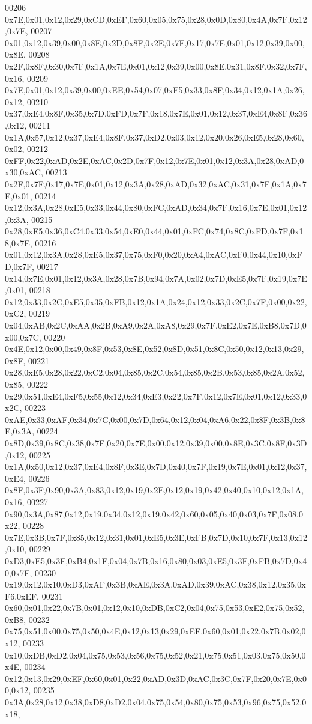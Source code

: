 \begin{DoxyCode}
00206 0x7E,0x01,0x12,0x29,0xCD,0xEF,0x60,0x05,0x75,0x28,0x0D,0x80,0x4A,0x7F,0x12,0x7E,
00207 0x01,0x12,0x39,0x00,0x8E,0x2D,0x8F,0x2E,0x7F,0x17,0x7E,0x01,0x12,0x39,0x00,0x8E,
00208 0x2F,0x8F,0x30,0x7F,0x1A,0x7E,0x01,0x12,0x39,0x00,0x8E,0x31,0x8F,0x32,0x7F,0x16,
00209 0x7E,0x01,0x12,0x39,0x00,0xEE,0x54,0x07,0xF5,0x33,0x8F,0x34,0x12,0x1A,0x26,0x12,
00210 0x37,0xE4,0x8F,0x35,0x7D,0xFD,0x7F,0x18,0x7E,0x01,0x12,0x37,0xE4,0x8F,0x36,0x12,
00211 0x1A,0x57,0x12,0x37,0xE4,0x8F,0x37,0xD2,0x03,0x12,0x20,0x26,0xE5,0x28,0x60,0x02,
00212 0xFF,0x22,0xAD,0x2E,0xAC,0x2D,0x7F,0x12,0x7E,0x01,0x12,0x3A,0x28,0xAD,0x30,0xAC,
00213 0x2F,0x7F,0x17,0x7E,0x01,0x12,0x3A,0x28,0xAD,0x32,0xAC,0x31,0x7F,0x1A,0x7E,0x01,
00214 0x12,0x3A,0x28,0xE5,0x33,0x44,0x80,0xFC,0xAD,0x34,0x7F,0x16,0x7E,0x01,0x12,0x3A,
00215 0x28,0xE5,0x36,0xC4,0x33,0x54,0xE0,0x44,0x01,0xFC,0x74,0x8C,0xFD,0x7F,0x18,0x7E,
00216 0x01,0x12,0x3A,0x28,0xE5,0x37,0x75,0xF0,0x20,0xA4,0xAC,0xF0,0x44,0x10,0xFD,0x7F,
00217 0x14,0x7E,0x01,0x12,0x3A,0x28,0x7B,0x94,0x7A,0x02,0x7D,0xE5,0x7F,0x19,0x7E,0x01,
00218 0x12,0x33,0x2C,0xE5,0x35,0xFB,0x12,0x1A,0x24,0x12,0x33,0x2C,0x7F,0x00,0x22,0xC2,
00219 0x04,0xAB,0x2C,0xAA,0x2B,0xA9,0x2A,0xA8,0x29,0x7F,0xE2,0x7E,0xB8,0x7D,0x00,0x7C,
00220 0x4E,0x12,0x00,0x49,0x8F,0x53,0x8E,0x52,0x8D,0x51,0x8C,0x50,0x12,0x13,0x29,0x8F,
00221 0x28,0xE5,0x28,0x22,0xC2,0x04,0x85,0x2C,0x54,0x85,0x2B,0x53,0x85,0x2A,0x52,0x85,
00222 0x29,0x51,0xE4,0xF5,0x55,0x12,0x34,0xE3,0x22,0x7F,0x12,0x7E,0x01,0x12,0x33,0x2C,
00223 0xAE,0x33,0xAF,0x34,0x7C,0x00,0x7D,0x64,0x12,0x04,0xA6,0x22,0x8F,0x3B,0x8E,0x3A,
00224 0x8D,0x39,0x8C,0x38,0x7F,0x20,0x7E,0x00,0x12,0x39,0x00,0x8E,0x3C,0x8F,0x3D,0x12,
00225 0x1A,0x50,0x12,0x37,0xE4,0x8F,0x3E,0x7D,0x40,0x7F,0x19,0x7E,0x01,0x12,0x37,0xE4,
00226 0x8F,0x3F,0x90,0x3A,0x83,0x12,0x19,0x2E,0x12,0x19,0x42,0x40,0x10,0x12,0x1A,0x16,
00227 0x90,0x3A,0x87,0x12,0x19,0x34,0x12,0x19,0x42,0x60,0x05,0x40,0x03,0x7F,0x08,0x22,
00228 0x7E,0x3B,0x7F,0x85,0x12,0x31,0x01,0xE5,0x3E,0xFB,0x7D,0x10,0x7F,0x13,0x12,0x10,
00229 0xD3,0xE5,0x3F,0xB4,0x1F,0x04,0x7B,0x16,0x80,0x03,0xE5,0x3F,0xFB,0x7D,0x40,0x7F,
00230 0x19,0x12,0x10,0xD3,0xAF,0x3B,0xAE,0x3A,0xAD,0x39,0xAC,0x38,0x12,0x35,0xF6,0xEF,
00231 0x60,0x01,0x22,0x7B,0x01,0x12,0x10,0xDB,0xC2,0x04,0x75,0x53,0xE2,0x75,0x52,0xB8,
00232 0x75,0x51,0x00,0x75,0x50,0x4E,0x12,0x13,0x29,0xEF,0x60,0x01,0x22,0x7B,0x02,0x12,
00233 0x10,0xDB,0xD2,0x04,0x75,0x53,0x56,0x75,0x52,0x21,0x75,0x51,0x03,0x75,0x50,0x4E,
00234 0x12,0x13,0x29,0xEF,0x60,0x01,0x22,0xAD,0x3D,0xAC,0x3C,0x7F,0x20,0x7E,0x00,0x12,
00235 0x3A,0x28,0x12,0x38,0xD8,0xD2,0x04,0x75,0x54,0x80,0x75,0x53,0x96,0x75,0x52,0x18,

\end{DoxyCode}
